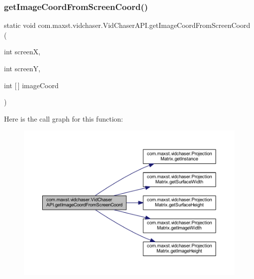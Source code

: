 \subsubsection{\texorpdfstring{get\+Image\+Coord\+From\+Screen\+Coord()}{getImageCoordFromScreenCoord()}}
{\footnotesize\ttfamily static void com.\+maxst.\+vidchaser.\+Vid\+Chaser\+A\+P\+I.\+get\+Image\+Coord\+From\+Screen\+Coord (\begin{DoxyParamCaption}\item[{int}]{screenX,  }\item[{int}]{screenY,  }\item[{int \mbox{[}$\,$\mbox{]}}]{image\+Coord }\end{DoxyParamCaption})\hspace{0.3cm}{\ttfamily [static]}}

Here is the call graph for this function\+:\nopagebreak
\begin{figure}[H]
\begin{center}
\leavevmode
\includegraphics[width=350pt]{classcom_1_1maxst_1_1vidchaser_1_1_vid_chaser_a_p_i_ad862cc3057d072216e0f3a7b4e9e295b_cgraph}
\end{center}
\end{figure}
\mbox{\label{classcom_1_1maxst_1_1vidchaser_1_1_vid_chaser_a_p_i_aa7555cd0125d9d7e3c2d3eae519ce1b0}} 
